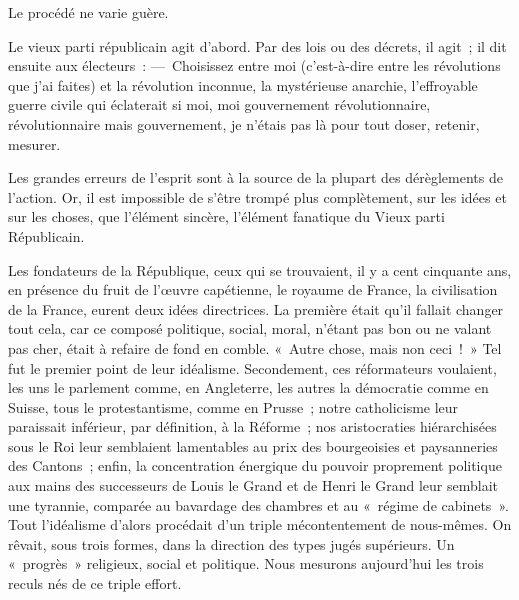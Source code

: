 \documentclass[french,twoside]{book} %
\newcommand{\astermono}{\medskip\centerline{\color{rubric}\large\selectfont{\syms ✻}}\medskip\par}%
\begin{document}
\astermono

\noindent Le procédé ne varie guère.\par
Le vieux parti républicain agit d’abord. Par des lois ou des décrets, il agit ; il dit ensuite aux électeurs : — Choisissez entre moi (c’est-à-dire entre les révolutions que j’ai faites) et la révolution inconnue, la mystérieuse anarchie, l’effroyable guerre civile qui éclaterait si moi, moi gouvernement révolutionnaire, révolutionnaire mais gouvernement, je n’étais pas là pour tout doser, retenir, mesurer.\par
Les grandes erreurs de l’esprit sont à la source de la plupart des dérèglements de l’action. Or, il est impossible de s’être trompé plus complètement, sur les idées et sur les choses, que l’élément sincère, l’élément fanatique du Vieux parti Républicain.\par
Les fondateurs de la République, ceux qui se trouvaient, il y a cent cinquante ans, en présence du fruit de l’œuvre capétienne, le royaume de France, la civilisation de la France, eurent deux idées directrices. La première était qu’il fallait changer tout cela, car ce composé politique, social, moral, n’étant pas bon ou ne valant pas cher, était à refaire de fond en comble. « Autre chose, mais non ceci ! » Tel fut le premier point de leur idéalisme. Secondement, ces réformateurs voulaient, les uns le parlement comme, en Angleterre, les autres la démocratie comme en Suisse, tous le protestantisme, comme en Prusse ; notre catholicisme leur paraissait inférieur, par définition, à la Réforme ; nos aristocraties hiérarchisées sous le Roi leur semblaient lamentables au prix des bourgeoisies et paysanneries des Cantons ; enfin, la concentration énergique du pouvoir proprement politique aux mains des successeurs de Louis le Grand et de Henri le Grand leur semblait une tyrannie, comparée au bavardage des chambres et au « régime de cabinets ». Tout l’idéalisme d’alors procédait d’un triple mécontentement de nous-mêmes. On rêvait, sous trois formes, dans la direction des types jugés supérieurs. Un « progrès » religieux, social et politique. Nous mesurons aujourd’hui les trois reculs nés de ce triple effort.\par

\astermono
\end{document}
